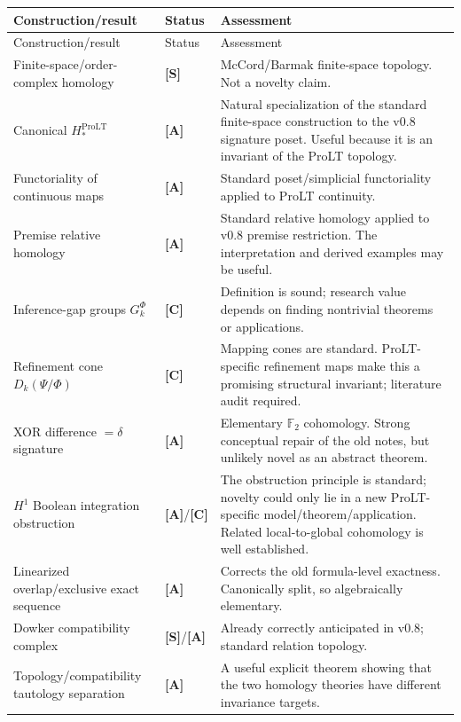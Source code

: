 \documentclass[11pt]{article}
\theoremstyle{definition}
\newcommand{\F}{\mathbb F_2}
\newcommand{\statusS}{\textbf{[S]}}
\newcommand{\statusA}{\textbf{[A]}}
\newcommand{\statusC}{\textbf{[C]}}
\begin{document}
\begin{longtable}{>{\raggedright\arraybackslash}p{}>{\raggedright\arraybackslash}p{}>{\raggedright\arraybackslash}p{}}
\toprule
Construction/result & Status & Assessment \\
\midrule
\endfirsthead
\toprule
Construction/result & Status & Assessment \\
\midrule
\endhead
Finite-space/order-complex homology & \statusS & McCord/Barmak finite-space topology. Not a novelty claim. \\
Canonical $H_*^{\mathrm{ProLT}}$ & \statusA & Natural specialization of the standard finite-space construction to the v0.8 signature poset. Useful because it is an invariant of the ProLT topology. \\
Functoriality of continuous maps & \statusA & Standard poset/simplicial functoriality applied to ProLT continuity. \\
Premise relative homology & \statusA & Standard relative homology applied to v0.8 premise restriction. The interpretation and derived examples may be useful. \\
Inference-gap groups $G_k^\Phi$ & \statusC & Definition is sound; research value depends on finding nontrivial theorems or applications. \\
Refinement cone $D_k(\Psi/\Phi)$ & \statusC & Mapping cones are standard. ProLT-specific refinement maps make this a promising structural invariant; literature audit required. \\
XOR difference $=\delta$ signature & \statusA & Elementary $\F$ cohomology. Strong conceptual repair of the old notes, but unlikely novel as an abstract theorem. \\
$H^1$ Boolean integration obstruction & \statusA/\statusC & The obstruction principle is standard; novelty could only lie in a new ProLT-specific model/theorem/application. Related local-to-global cohomology is well established. \\
Linearized overlap/exclusive exact sequence & \statusA & Corrects the old formula-level exactness. Canonically split, so algebraically elementary. \\
Dowker compatibility complex & \statusS/\statusA & Already correctly anticipated in v0.8; standard relation topology. \\
Topology/compatibility tautology separation & \statusA & A useful explicit theorem showing that the two homology theories have different invariance targets. \\

\end{longtable}
\end{document}
